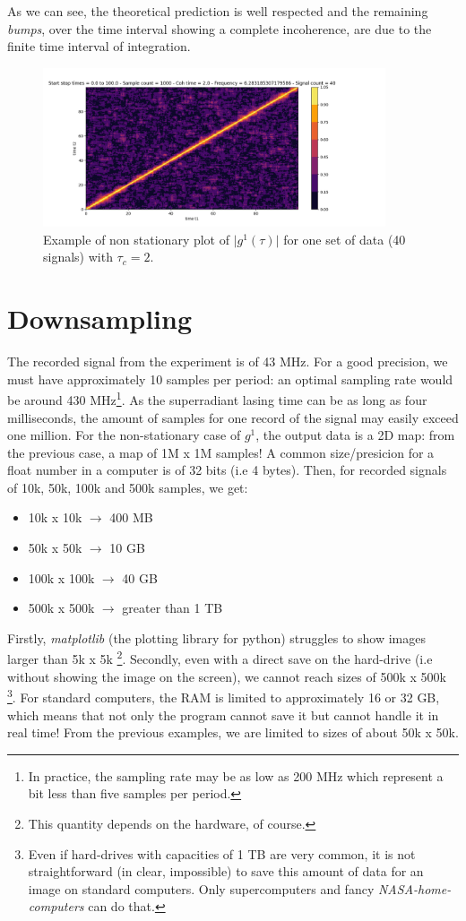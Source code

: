 \documentclass[11pt]{report}
\begin{document}
As we can see, the theoretical prediction is well respected and the remaining \textit{bumps}, over the time interval showing a complete incoherence, are due to the finite time interval of integration.

\begin{figure}[h!]
\centering
\includegraphics[width=0.9\textwidth]{test_g12}
\caption{Example of non stationary plot of $\vert g^1(\tau) \vert$ for one set of data (40 signals) with $\tau_c=2$.}
\end{figure}

\section{Downsampling}

The recorded signal from the experiment is of 43 MHz. For a good precision, we must have approximately 10 samples per period: an optimal sampling rate would be around 430 MHz\footnote{In practice, the sampling rate may be as low as 200 MHz which represent a bit less than five samples per period.}. As the superradiant lasing time can be as long as four milliseconds, the amount of samples for one record of the signal may easily exceed one million. For the non-stationary case of $g^1$, the output data is a 2D map: from the previous case, a map of 1M x 1M samples! A common size/presicion for a float number in a computer is of 32 bits (i.e 4 bytes). Then, for recorded signals of 10k, 50k, 100k and 500k samples, we get:
\begin{itemize}
	\item 10k x 10k $\rightarrow$ 400 MB
	\item 50k x 50k $\rightarrow$ 10 GB
	\item 100k x 100k $\rightarrow$ 40 GB
	\item 500k x 500k $\rightarrow$ greater than 1 TB
\end{itemize}
Firstly, \textit{matplotlib} (the plotting library for python) struggles to show images larger than 5k x 5k \footnote{This quantity depends on the hardware, of course.}. Secondly, even with a direct save on the hard-drive (i.e without showing the image on the screen), we cannot reach sizes of 500k x 500k \footnote{Even if hard-drives with capacities of 1 TB are very common, it is not straightforward (in clear, impossible) to save this amount of data for an image on standard computers. Only supercomputers and fancy \textit{NASA-home-computers} can do that.}. For standard computers, the RAM is limited to approximately 16 or 32 GB, which means that not only the program cannot save it but cannot handle it in real time! From the previous examples, we are limited to sizes of about 50k x 50k.
\end{document}
